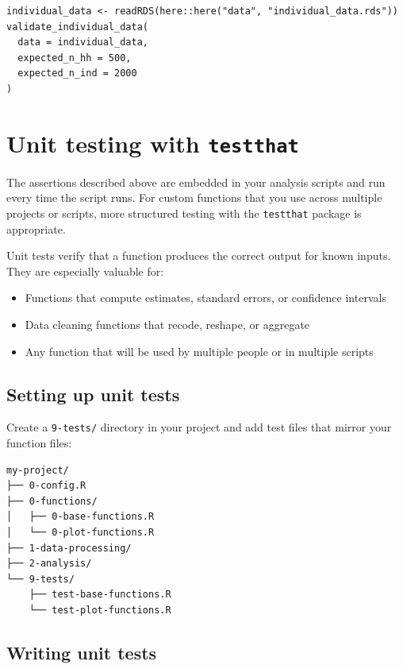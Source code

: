 \documentclass[
]{book}
\providecommand{\tightlist}{%
  \setlength{\itemsep}{0pt}\setlength{\parskip}{0pt}}
\begin{document}
\begin{verbatim}
individual_data <- readRDS(here::here("data", "individual_data.rds"))
validate_individual_data(
  data = individual_data,
  expected_n_hh = 500,
  expected_n_ind = 2000
)
\end{verbatim}

\section{\texorpdfstring{Unit testing with \texttt{testthat}}{Unit testing with testthat}}\label{unit-testing-with-testthat}

The assertions described above are embedded in your analysis scripts and run every time the script runs. For custom functions that you use across multiple projects or scripts, more structured testing with the \texttt{testthat} package is appropriate.

Unit tests verify that a function produces the correct output for known inputs. They are especially valuable for:

\begin{itemize}
\tightlist
\item
  Functions that compute estimates, standard errors, or confidence intervals
\item
  Data cleaning functions that recode, reshape, or aggregate
\item
  Any function that will be used by multiple people or in multiple scripts
\end{itemize}

\subsection{Setting up unit tests}\label{setting-up-unit-tests}

Create a \texttt{9-tests/} directory in your project and add test files that mirror your function files:

\begin{verbatim}
my-project/
├── 0-config.R
├── 0-functions/
│   ├── 0-base-functions.R
│   └── 0-plot-functions.R
├── 1-data-processing/
├── 2-analysis/
└── 9-tests/
    ├── test-base-functions.R
    └── test-plot-functions.R
\end{verbatim}

\subsection{Writing unit tests}\label{writing-unit-tests}
\end{document}
